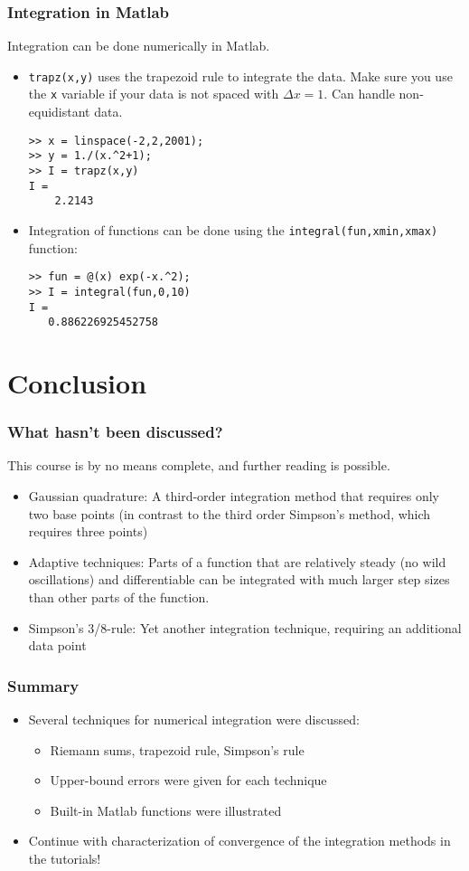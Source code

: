 \begin{frame}[fragile]
  \frametitle{Integration in Matlab}
  Integration can be done numerically in Matlab.
  \begin{itemize}
    \item \lstinline$trapz(x,y)$ uses the trapezoid rule to integrate the data. Make sure you use the \lstinline$x$ variable if your data is not spaced with $\Delta x=1$. Can handle non-equidistant data.
    \begin{lstlisting}
>> x = linspace(-2,2,2001);
>> y = 1./(x.^2+1);
>> I = trapz(x,y)
I =
    2.2143
\end{lstlisting}
    \item Integration of functions can be done using the \lstinline$integral(fun,xmin,xmax)$ function:
    \begin{lstlisting}
>> fun = @(x) exp(-x.^2);
>> I = integral(fun,0,10)
I =
   0.886226925452758
    \end{lstlisting}
  \end{itemize}
\end{frame}

\section{Conclusion}
\begin{frame}
  \frametitle{What hasn't been discussed?}
  This course is by no means complete, and further reading is possible.
   \begin{itemize}
      \item Gaussian quadrature: A third-order integration method that requires only two base points (in contrast to the third order Simpson's method, which requires three points)
      \item Adaptive techniques: Parts of a function that are relatively steady (no wild oscillations) and differentiable can be integrated with much larger step sizes than other parts of the function.
      \item Simpson's 3/8-rule: Yet another integration technique, requiring an additional data point
   \end{itemize}
\end{frame}

\begin{frame}
  \frametitle{Summary}
  \begin{itemize}
    \item Several techniques for numerical integration were discussed:
    \begin{itemize}
      \item Riemann sums, trapezoid rule, Simpson's rule
      \item Upper-bound errors were given for each technique
      \item Built-in Matlab functions were illustrated
    \end{itemize}
    \item Continue with characterization of convergence of the integration methods in the tutorials!
  \end{itemize}
\end{frame}

